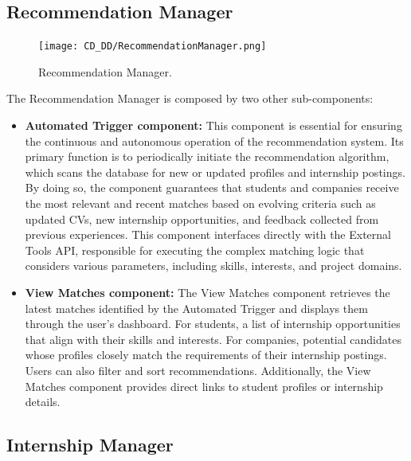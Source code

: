\begin{itemize}
\end{itemize}

\subsection{Recommendation Manager}
\label{subsec:recommendation_manager}%

\begin{figure}[H]
    \begin{center}
        \texttt{[image: CD\_DD/RecommendationManager.png]}
        \caption{Recommendation Manager.}
        \label{fig:recommendation_manager}%
    \end{center}
\end{figure}

\noindent The Recommendation Manager is composed by two other sub-components:

\begin{itemize}
    \item \textbf{Automated Trigger component:} This component is essential for ensuring the continuous and autonomous operation of the recommendation system. Its primary function is to periodically initiate the recommendation algorithm, which scans the database for new or updated profiles and internship postings. By doing so, the component guarantees that students and companies receive the most relevant and recent matches based on evolving criteria such as updated CVs, new internship opportunities, and feedback collected from previous experiences. This component interfaces directly with the External Tools API, responsible for executing the complex matching logic that considers various parameters, including skills, interests, and project domains.
    \item \textbf{View Matches component:} The View Matches component retrieves the latest matches identified by the Automated Trigger and displays them through the user’s dashboard. For students, a list of internship opportunities that align with their skills and interests. For companies, potential candidates whose profiles closely match the requirements of their internship postings. Users can also filter and sort recommendations. Additionally, the View Matches component provides direct links to student profiles or internship details.
\end{itemize}

\subsection{Internship Manager}
\label{subsec:internship_manager}%


